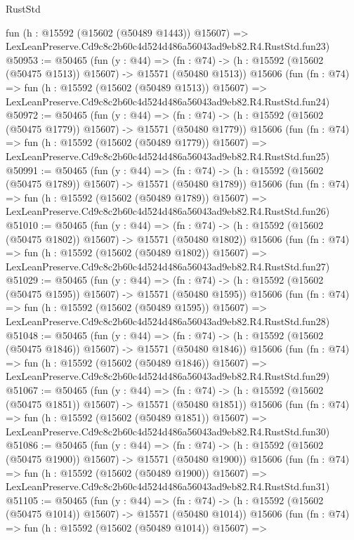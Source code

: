 \begin{lexlean}{RustStd}
\begin{coremodule}
    fun (h : @15592 (@15602 (@50489 @1443)) @15607) =>
    LexLeanPreserve.Cd9c8c2b60c4d524d486a56043ad9eb82.R4.RustStd.fun23)
@50953 := @50465
    (fun (y : @44) =>
    (fn : @74) -> (h : @15592 (@15602 (@50475 @1513)) @15607) -> @15571 (@50480 @1513))
    @15606
    (fun (fn : @74) =>
    fun (h : @15592 (@15602 (@50489 @1513)) @15607) =>
    LexLeanPreserve.Cd9c8c2b60c4d524d486a56043ad9eb82.R4.RustStd.fun24)
@50972 := @50465
    (fun (y : @44) =>
    (fn : @74) -> (h : @15592 (@15602 (@50475 @1779)) @15607) -> @15571 (@50480 @1779))
    @15606
    (fun (fn : @74) =>
    fun (h : @15592 (@15602 (@50489 @1779)) @15607) =>
    LexLeanPreserve.Cd9c8c2b60c4d524d486a56043ad9eb82.R4.RustStd.fun25)
@50991 := @50465
    (fun (y : @44) =>
    (fn : @74) -> (h : @15592 (@15602 (@50475 @1789)) @15607) -> @15571 (@50480 @1789))
    @15606
    (fun (fn : @74) =>
    fun (h : @15592 (@15602 (@50489 @1789)) @15607) =>
    LexLeanPreserve.Cd9c8c2b60c4d524d486a56043ad9eb82.R4.RustStd.fun26)
@51010 := @50465
    (fun (y : @44) =>
    (fn : @74) -> (h : @15592 (@15602 (@50475 @1802)) @15607) -> @15571 (@50480 @1802))
    @15606
    (fun (fn : @74) =>
    fun (h : @15592 (@15602 (@50489 @1802)) @15607) =>
    LexLeanPreserve.Cd9c8c2b60c4d524d486a56043ad9eb82.R4.RustStd.fun27)
@51029 := @50465
    (fun (y : @44) =>
    (fn : @74) -> (h : @15592 (@15602 (@50475 @1595)) @15607) -> @15571 (@50480 @1595))
    @15606
    (fun (fn : @74) =>
    fun (h : @15592 (@15602 (@50489 @1595)) @15607) =>
    LexLeanPreserve.Cd9c8c2b60c4d524d486a56043ad9eb82.R4.RustStd.fun28)
@51048 := @50465
    (fun (y : @44) =>
    (fn : @74) -> (h : @15592 (@15602 (@50475 @1846)) @15607) -> @15571 (@50480 @1846))
    @15606
    (fun (fn : @74) =>
    fun (h : @15592 (@15602 (@50489 @1846)) @15607) =>
    LexLeanPreserve.Cd9c8c2b60c4d524d486a56043ad9eb82.R4.RustStd.fun29)
@51067 := @50465
    (fun (y : @44) =>
    (fn : @74) -> (h : @15592 (@15602 (@50475 @1851)) @15607) -> @15571 (@50480 @1851))
    @15606
    (fun (fn : @74) =>
    fun (h : @15592 (@15602 (@50489 @1851)) @15607) =>
    LexLeanPreserve.Cd9c8c2b60c4d524d486a56043ad9eb82.R4.RustStd.fun30)
@51086 := @50465
    (fun (y : @44) =>
    (fn : @74) -> (h : @15592 (@15602 (@50475 @1900)) @15607) -> @15571 (@50480 @1900))
    @15606
    (fun (fn : @74) =>
    fun (h : @15592 (@15602 (@50489 @1900)) @15607) =>
    LexLeanPreserve.Cd9c8c2b60c4d524d486a56043ad9eb82.R4.RustStd.fun31)
@51105 := @50465
    (fun (y : @44) =>
    (fn : @74) -> (h : @15592 (@15602 (@50475 @1014)) @15607) -> @15571 (@50480 @1014))
    @15606
    (fun (fn : @74) =>
    fun (h : @15592 (@15602 (@50489 @1014)) @15607) =>

\end{coremodule}
\end{lexlean}
